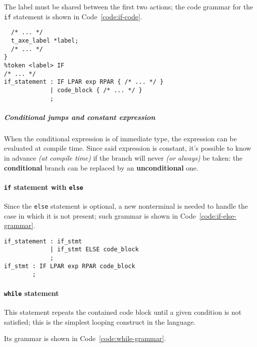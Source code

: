 \documentclass[english]{article}
\begin{document}
The label must be shared between the first two actions; the code grammar for the \texttt{if} statement is shown in Code~\ref{code:if-code}.

\begin{onepage}
  \begin{lstlisting}[language=LANCE, caption={Code for the if statement}, label={code:if-code}]
%union {
  /* ... */
  t_axe_label *label;
  /* ... */
}
%token <label> IF
/* ... */
if_statement : IF LPAR exp RPAR { /* ... */ }
             | code_block { /* ... */ }
             ;
\end{lstlisting}
\end{onepage}

\subparagraph*{Conditional jumps and constant expression}

When the conditional expression is of immediate type, the expression can be evaluated at compile time.
Since said expression is constant, it's possible to know in advance \textit{(at compile time)} if the branch will never \textit{(or always)} be taken: the \textbf{conditional} branch can be replaced by an \textbf{unconditional} one.

\paragraph{\texttt{if} statement with \texttt{else}}

Since the \texttt{else} statement is optional, a new nonterminal is needed to handle the case in which it is not present;
such grammar is shown in Code~\ref{code:if-else-grammar}.

\begin{onepage}
  \begin{lstlisting}[language=LANCE, caption={Grammar for the if statement with else}, label={code:if-else-grammar}]
if_statement : if_stmt
             | if_stmt ELSE code_block
             ;
if_stmt : IF LPAR exp RPAR code_block
        ;
\end{lstlisting}
\end{onepage}

\paragraph{\texttt{while} statement}

This statement repeats the contained code block until a given condition is not satisfied;
this is the simplest looping construct in the language.

Its grammar is shown in Code~\ref{code:while-grammar}.
\end{document}
